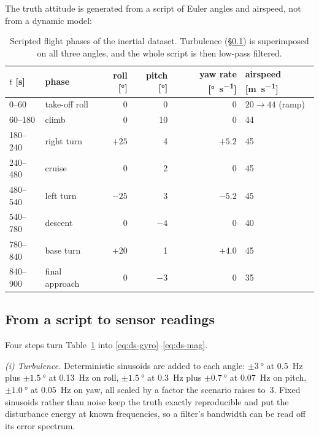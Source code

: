 The truth attitude is generated from a script of Euler angles and airspeed, not from a dynamic
model:

\begin{table}[H]\centering\small
\caption{Scripted flight phases of the inertial dataset. Turbulence (\S\ref{sec:ds-imu-turb}) is
superimposed on all three angles, and the whole script is then low-pass filtered.}
\label{tab:ds-imu-script}
\begin{tabular}{@{}llrrrl@{}}\toprule
$t$ [\si{\second}] & phase & roll [\si{\degree}] & pitch [\si{\degree}] & yaw rate [\si{\degree\per\second}] & airspeed [\si{\metre\per\second}] \\ \midrule
0--60    & take-off roll   & 0    & 0   & 0    & $20 \to 44$ (ramp) \\
60--180  & climb           & 0    & 10  & 0    & 44 \\
180--240 & right turn      & $+25$& 4   & $+5.2$ & 45 \\
240--480 & cruise          & 0    & 2   & 0    & 45 \\
480--540 & left turn       & $-25$& 3   & $-5.2$ & 45 \\
540--780 & descent         & 0    & $-4$& 0    & 40 \\
780--840 & base turn       & $+20$& 1   & $+4.0$ & 45 \\
840--900 & final approach  & 0    & $-3$& 0    & 35 \\
\bottomrule\end{tabular}
\end{table}

\subsection{From a script to sensor readings}
\label{sec:ds-imu-turb}

Four steps turn Table~\ref{tab:ds-imu-script} into \eqref{eq:ds-gyro}--\eqref{eq:ds-mag}.

\emph{(i) Turbulence.} Deterministic sinusoids are added to each angle: $\pm\SI{3}{\degree}$ at
\SI{0.5}{\hertz} plus $\pm\SI{1.5}{\degree}$ at \SI{0.13}{\hertz} on roll, $\pm\SI{1.5}{\degree}$ at
\SI{0.3}{\hertz} plus $\pm\SI{0.7}{\degree}$ at \SI{0.07}{\hertz} on pitch, $\pm\SI{1.0}{\degree}$ at
\SI{0.05}{\hertz} on yaw, all scaled by a factor the  scenario raises to~3.
Fixed sinusoids rather than noise keep the truth exactly reproducible and put the disturbance energy
at known frequencies, so a filter's bandwidth can be read off its error spectrum.

